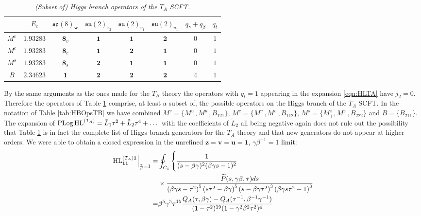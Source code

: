 \documentclass[main.tex]{subfiles}
\begin{document}
\begin{table}
\centering
\begin{tabular}{|c |c|c|c|c|c|c|c|} 
 \hline
 &$E_c$&$\mathfrak{so}(8)_{\mathbf{w}}$&$\mathfrak{su}(2)_{z_2}$&$\mathfrak{su}(2)_{v_1}$&$\mathfrak{su}(2)_{u_1}$&$q_{\gamma}+q_{\beta}$&$q_{t}$\\\hline\hline
$M^{v}$&$1.93283$&$\mathbf{8}_v$&$\mathbf{1}$&$\mathbf{1}$&$\mathbf{2}$&$0$&$1$\\
$M^{c}$&$1.93283$&$\mathbf{8}_c$&$\mathbf{1}$&$\mathbf{2}$&$\mathbf{1}$&$0$&$1$\\
$M^{s}$&$1.93283$&$\mathbf{8}_s$&$\mathbf{2}$&$\mathbf{1}$&$\mathbf{1}$&$0$&$1$\\
$B$&$2.34623$&$\mathbf{1}$&$\mathbf{2}$&$\mathbf{2}$&$\mathbf{2}$&$4$&$1$\\\hline
\end{tabular}
\caption{\textit{(Subset of) Higgs branch operators of the $T_A$ SCFT.}}
\label{tab:HBOpsTA}
\end{table}
By the same arguments as the ones made for the $T_B$ theory the operators with $q_t=1$ appearing in the expansion \eqref{eqn:HLTA} have $j_2=0$. Therefore the operators of Table \ref{tab:HBOpsTA} comprise, at least a subset of, the possible operators on the Higgs branch of the $T_A$ SCFT. In the notation of Table \ref{tab:HBOpsTB} we have combined $M^v=\{M_+^u,M_-^u,B_{121}\}$, $M^c=\{M_+^v,M_-^v,B_{112}\}$, $M^s=\{M_+^z,M_-^z,B_{222}\}$ and $B=\{B_{211}\}$. The expansion of $\operatorname{\mathrm{PLog}}\textrm{HL}^{(T_A)}=\tilde{L}_1\tau^2+\tilde{L}_2\tau^4+\dots$ with the coefficients of $\tilde{L}_2$ all being negative again does not rule out the possibility that Table \ref{tab:HBOpsTA} is in fact the complete list of Higgs branch generators for the $T_A$ theory and that new generators do not appear at higher orders.
We were able to obtain a closed expression in the unrefined $\mathbf{z}=\mathbf{v}=\mathbf{u}=\mathbf{1}$, $\gamma\beta^{-1}=1$ limit:
\begin{equation}\label{eqn:HLTAunref}
\begin{aligned}
\left.\textrm{HL}^{(T_A)\mathbf{1}}_{\mathbf{1}\mathbf{1}}\right|_{\frac{\gamma}{\beta}=1}=&\oint_{C_1}\Bigg\{\frac{1}{(s-\beta  \gamma )^2 (\beta  \gamma  s-1)^2}\\
&\times\frac{\widetilde{P}(s,\gamma\beta,\tau)ds}{ \left(\beta  \gamma  s-\tau ^2\right)^5 \left(s \tau ^2-\beta  \gamma \right)^5 \left(s-\beta  \gamma  \tau ^2\right)^3 \left(\beta  \gamma  s \tau^2-1\right)^3}\\
=&\beta^5\gamma^5\tau^{15}\frac{Q_A(\tau,\beta\gamma)-Q_A(\tau^{-1},\beta^{-1}\gamma^{-1})}{(1-\tau^2)^{19}(1-\gamma^2\beta^2\tau^2)^4}
\end{aligned}
\end{equation}
\end{document}
